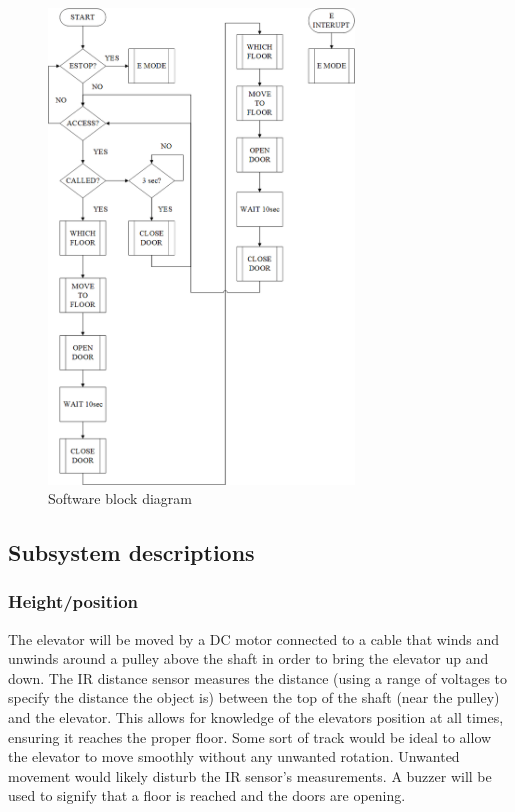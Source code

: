 \documentclass{article}
\begin{document}
	    \begin{figure}[!ht]
	        \begin{center}
	        \includegraphics[width=230pt]{swbd.png}
		    \caption{Software block diagram}
		    \label{fig:software_block_diagram}
		    \end{center}
	    \end{figure}
	  
        \subsection{Subsystem descriptions}
        \subsubsection{Height/position}
	    The elevator will be moved by a DC motor connected to a cable that winds and unwinds around a pulley above the shaft in order to bring the elevator up and down. The IR distance sensor measures the distance (using a range of voltages to specify the distance the object is) between the top of the shaft (near the pulley) and the elevator. This allows for knowledge of the elevators position at all times, ensuring it reaches the proper floor. Some sort of track would be ideal to allow the elevator to move smoothly without any unwanted rotation. Unwanted movement would likely disturb the IR sensor's measurements. A buzzer will be used to signify that a floor is reached and the doors are opening.
	    
\end{document}
